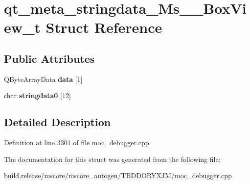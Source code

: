 \hypertarget{structqt__meta__stringdata___ms_____box_view__t}{}\section{qt\+\_\+meta\+\_\+stringdata\+\_\+\+Ms\+\_\+\+\_\+\+Box\+View\+\_\+t Struct Reference}
\label{structqt__meta__stringdata___ms_____box_view__t}
\subsection*{Public Attributes}
\begin{DoxyCompactItemize}
\item 
\mbox{\label{structqt__meta__stringdata___ms_____box_view__t_a53c44228edb6d087add6ebdb011b6a56}} 
Q\+Byte\+Array\+Data {\bfseries data} \mbox{[}1\mbox{]}
\item 
\mbox{\label{structqt__meta__stringdata___ms_____box_view__t_a1bebcac620164fd57d53b3acdafc9fee}} 
char {\bfseries stringdata0} \mbox{[}12\mbox{]}
\end{DoxyCompactItemize}


\subsection{Detailed Description}


Definition at line 3301 of file moc\+\_\+debugger.\+cpp.



The documentation for this struct was generated from the following file\+:\begin{DoxyCompactItemize}
\item 
build.\+release/mscore/mscore\+\_\+autogen/\+T\+B\+D\+D\+O\+R\+Y\+X\+J\+M/moc\+\_\+debugger.\+cpp\end{DoxyCompactItemize}
